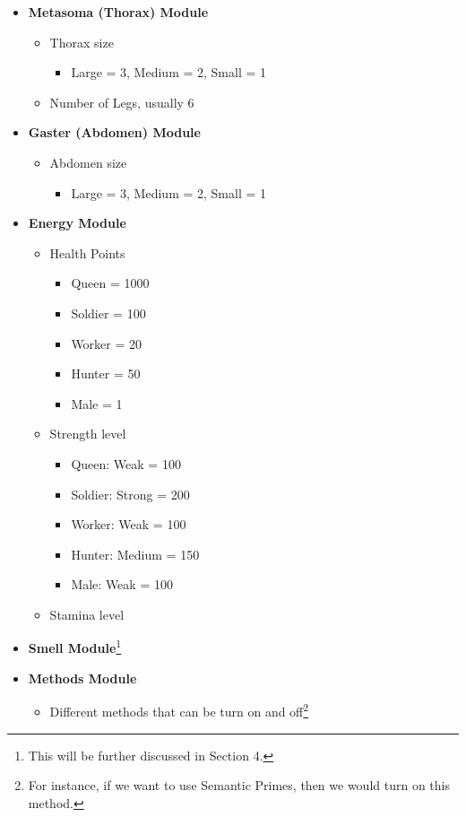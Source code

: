 \documentclass[titlepage, 12pt]{article}
\begin{document}
\begin{itemize}
\begin{itemize}
		\begin{itemize}
		\item Large  = 3, Medium = 2, Small = 1
		\end{itemize}
	\end{itemize}
\item {\bf Metasoma (Thorax) Module}
	\begin{itemize}
	\item Thorax size
		\begin{itemize}
		\item Large  = 3, Medium = 2, Small = 1
		\end{itemize}
	\item Number of Legs, usually 6
	\end{itemize}
\item {\bf Gaster (Abdomen) Module}
	\begin{itemize}
	\item Abdomen size
		\begin{itemize}
		\item Large  = 3, Medium = 2, Small = 1
		\end{itemize}
	\end{itemize}
\item {\bf Energy Module}
	\begin{itemize}
	\item Health Points
		\begin{itemize}
		\item Queen  = 1000
		\item Soldier = 100
		\item Worker = 20
		\item Hunter = 50
		\item Male = 1
		\end{itemize}
	\item Strength level
		\begin{itemize}
		\item Queen: Weak =  100 
		\item Soldier: Strong = 200
		\item Worker: Weak = 100
		\item Hunter: Medium = 150
		\item Male: Weak = 100
		\end{itemize}
	\item Stamina level
	\end{itemize}
\item {\bf Smell Module}\footnote{This will be further discussed in Section 4.} \newpage
\item {\bf Methods Module}
	\begin{itemize}
	\item Different methods that can be turn on and off\footnote{For instance, if we want to use Semantic Primes, then we would turn on this method.}
	\end{itemize} 
\end{itemize}  
\end{document}

